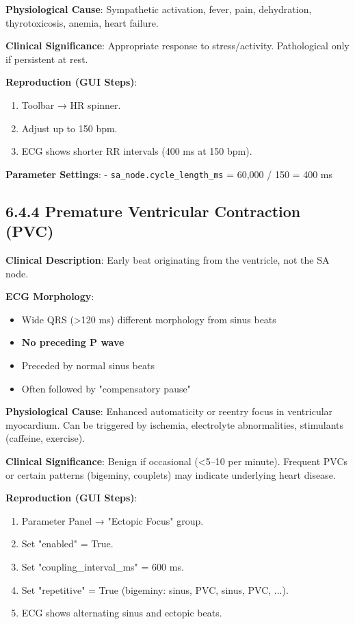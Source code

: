 \documentclass[12pt,oneside,a4paper]{book}
\newcommand{\code}[1]{\texttt{#1}}
\begin{document}
\textbf{Physiological Cause}:
Sympathetic activation, fever, pain, dehydration, thyrotoxicosis, anemia, heart failure.

\textbf{Clinical Significance}:
Appropriate response to stress/activity. Pathological only if persistent at rest.

\textbf{Reproduction (GUI Steps)}:
\begin{enumerate}
  \item Toolbar → HR spinner.
  \item Adjust up to 150 bpm.
  \item ECG shows shorter RR intervals (400 ms at 150 bpm).
\end{enumerate}

\textbf{Parameter Settings}:
- \code{sa\_node.cycle\_length\_ms} = 60,000 / 150 = 400 ms

\subsection{6.4.4 Premature Ventricular Contraction (PVC)}

\textbf{Clinical Description}:
Early beat originating from the ventricle, not the SA node.

\textbf{ECG Morphology}:
\begin{itemize}
  \item Wide QRS (\textgreater 120 ms) different morphology from sinus beats
  \item \textbf{No preceding P wave}
  \item Preceded by normal sinus beats
  \item Often followed by "compensatory pause"
\end{itemize}

\textbf{Physiological Cause}:
Enhanced automaticity or reentry focus in ventricular myocardium. Can be triggered by ischemia, electrolyte abnormalities, stimulants (caffeine, exercise).

\textbf{Clinical Significance}:
Benign if occasional (\textless 5--10 per minute). Frequent PVCs or certain patterns (bigeminy, couplets) may indicate underlying heart disease.

\textbf{Reproduction (GUI Steps)}:
\begin{enumerate}
  \item Parameter Panel → "Ectopic Focus" group.
  \item Set "enabled" = True.
  \item Set "coupling\_interval\_ms" = 600 ms.
  \item Set "repetitive" = True (bigeminy: sinus, PVC, sinus, PVC, ...).
  \item ECG shows alternating sinus and ectopic beats.
\end{enumerate}
\end{document}
